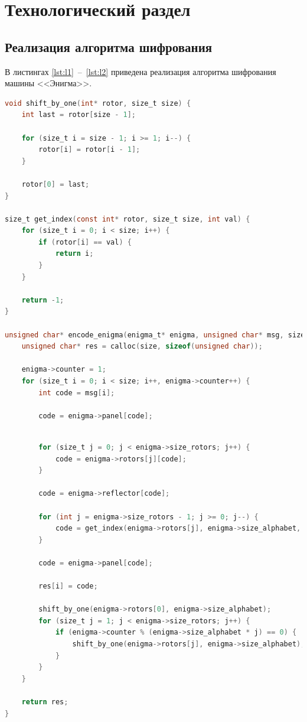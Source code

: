 \chapter{Технологический раздел}

\section{Реализация алгоритма шифрования}

В листингах \ref{lst:l1}~--~\ref{lst:l2} приведена реализация алгоритма шифрования машины <<Энигма>>.
\begin{lstlisting}[language=C, label=lst:l1, caption={Реализация алгоритма шифрования (начало)}]
void shift_by_one(int* rotor, size_t size) {
    int last = rotor[size - 1];

    for (size_t i = size - 1; i >= 1; i--) {
        rotor[i] = rotor[i - 1];
    }

    rotor[0] = last;
}

size_t get_index(const int* rotor, size_t size, int val) {
    for (size_t i = 0; i < size; i++) {
        if (rotor[i] == val) {
            return i;
        }
    }

    return -1;
}

unsigned char* encode_enigma(enigma_t* enigma, unsigned char* msg, size_t size) {
    unsigned char* res = calloc(size, sizeof(unsigned char));

    enigma->counter = 1;
    for (size_t i = 0; i < size; i++, enigma->counter++) {
        int code = msg[i];

        code = enigma->panel[code];
\end{lstlisting}

\newpage
        
\begin{lstlisting}[language=C, label=lst:l2, caption={Реализация алгоритма шифрования (продолжение \ref{lst:l1})}]

		for (size_t j = 0; j < enigma->size_rotors; j++) {
            code = enigma->rotors[j][code];
        }

        code = enigma->reflector[code];

        for (int j = enigma->size_rotors - 1; j >= 0; j--) {
            code = get_index(enigma->rotors[j], enigma->size_alphabet, code);
        }

        code = enigma->panel[code];

        res[i] = code;

        shift_by_one(enigma->rotors[0], enigma->size_alphabet);
        for (size_t j = 1; j < enigma->size_rotors; j++) {
            if (enigma->counter % (enigma->size_alphabet * j) == 0) {
                shift_by_one(enigma->rotors[j], enigma->size_alphabet);
            }
        }
    }

    return res;
}
\end{lstlisting}

